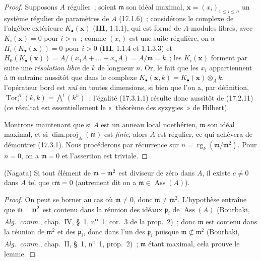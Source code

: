 \begin{proof}
Supposons $A$ régulier~; soient $\mathfrak{m}$ son idéal maximal,
$\mathbf{x}=(x_i)_{1\leq i\leq n}$ un système régulier de paramètres de $A$
(17.1.6)~; considérons le complexe de l'algèbre extérieure
$K_\bullet(\mathbf{x})$ (\textbf{III}, 1.1.1), qui est formé de $A$-modules
libres, avec $K_i(\mathbf{x})=0$ pour $i>n$~; comme $(x_i)$ est une suite
régulière, on a $H_i(K_\bullet(\mathbf{x}))=0$ pour $i>0$ (\textbf{III},
1.1.4 et 1.1.3.3) et
$H_0(K_\bullet(\mathbf{x}))=A/(x_1A+\ldots+x_nA)=A/\mathfrak{m}=k$~; les
$K_i(\mathbf{x})$ forment par suite une \emph{résolution libre} de $k$ de
longueur $n$. Or, le fait que les $x_i$ appartiennent à $\mathfrak{m}$
entraîne aussitôt que dans le complexe
$K_\bullet(\mathbf{x},k)=K_\bullet(\mathbf{x})\otimes_A k$, l'opérateur bord
est \emph{nul} en toutes dimensions, si bien que l'on a, par définition,
$\operatorname{Tor}^A_i(k,k)=\bigwedge^i(k^n)$~; l'égalité (17.3.1.1) résulte
donc aussitôt de (17.2.11) (ce résultat est essentiellement le «~théorème des
syzygies~» de Hilbert).

Montrons maintenant que si $A$ est un anneau local noethérien,
$\mathfrak{m}$ son idéal maximal, et si
$\operatorname{dim.proj}_A(\mathfrak{m})$ est \emph{finie}, alors $A$ est
régulier, ce qui achèvera de démontrer (17.3.1). Nous procéderons par
récurrence sur $n=\operatorname{rg}_k(\mathfrak{m}/\mathfrak{m}^2)$. Pour
$n=0$, on a $\mathfrak{m}=0$ et l'assertion est triviale.
\end{proof}

\begin{lemma}[17.3.1.2]
\label{0.17.3.1.2-fr}
\textnormal{(Nagata)} Si tout élément de
$\mathfrak{m}-\mathfrak{m}^2$ est diviseur de zéro dans $A$, il existe
$c\neq0$ dans $A$ tel que $c\mathfrak{m}=0$ (autrement dit on a
$\mathfrak{m}\in\operatorname{Ass}(A)$).
\end{lemma}

\begin{proof}
On peut se borner au cas où $\mathfrak{m}\neq0$, donc
$\mathfrak{m}\neq\mathfrak{m}^2$. L'hypothèse entraîne que
$\mathfrak{m}-\mathfrak{m}^2$ est contenu dans la réunion des idéaux
$\mathfrak{p}_i$ de $\operatorname{Ass}(A)$ (Bourbaki,
\emph{Alg.~comm.}, chap.~IV, \S~1, n\textsuperscript{o}~1, cor.~3 de la prop.~2)~; donc
$\mathfrak{m}$ est contenu dans la réunion de $\mathfrak{m}^2$
et des $\mathfrak{p}_i$, donc dans l'un des $\mathfrak{p}_i$ puisque
$\mathfrak{m}\not\subset\mathfrak{m}^2$ (Bourbaki, \emph{Alg.~comm.},
chap.~II, \S~1, n\textsuperscript{o}~1, prop.~2)~; $\mathfrak{m}$ étant maximal, cela prouve le
lemme.
\end{proof}


